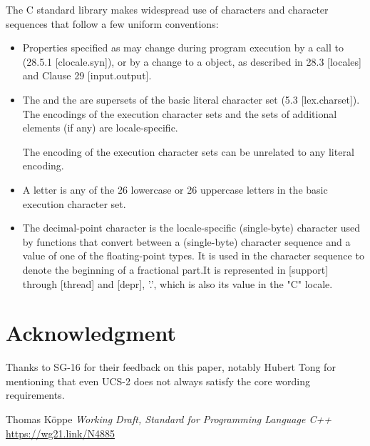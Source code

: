 \documentclass{wg21}
\begin{document}
The C standard library makes widespread use of characters and character sequences that follow a few uniform conventions:

\begin{itemize}
\item Properties specified as  may change during program execution by a call to  (28.5.1 [clocale.syn]), or by a change to a  object, as described in 28.3 [locales] and Clause 29 [input.output].
\item The  and the  are supersets of the basic literal character set (5.3 [lex.charset]). The encodings of the execution character sets and the sets of additional elements (if any) are locale-specific.  

\begin{note}
The encoding of the execution character sets can be unrelated to any literal encoding.
\end{note}

\item A letter is any of the 26 lowercase or 26 uppercase letters in the basic execution character set.

\item The decimal-point character is the locale-specific (single-byte) character used by functions that convert between a (single-byte) character sequence and a value of one of the floating-point types. It is used in the character sequence to denote the beginning of a fractional part.It is represented in [support] through [thread] and [depr], ’.’, which is also its value in the "C" locale.
\end{itemize}

\section{Acknowledgment}

Thanks to SG-16 for their feedback on this paper, notably Hubert Tong for mentioning that even UCS-2 does not always satisfy the core wording requirements.





\renewcommand{\section}[2]{}%
\begin{thebibliography}{9}
    Thomas Köppe
    \emph{Working Draft, Standard for Programming Language C++}\newline
    \url{https://wg21.link/N4885}
\end{thebibliography}
\end{document}
